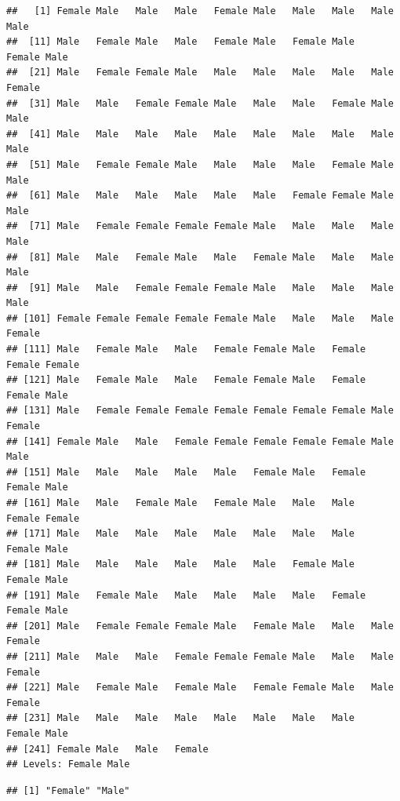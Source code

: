 \documentclass[10pt,ngerman,onside]{article}
\newenvironment{Shaded}{\begin{snugshade}}{\end{snugshade}}
\newcommand{\KeywordTok}[1]{\textcolor[rgb]{0.13,0.29,0.53}{\textbf{#1}}}
\newcommand{\CommentTok}[1]{\textcolor[rgb]{0.56,0.35,0.01}{\textit{#1}}}
\newcommand{\OperatorTok}[1]{\textcolor[rgb]{0.81,0.36,0.00}{\textbf{#1}}}
\newcommand{\NormalTok}[1]{#1}
\begin{document}
\begin{verbatim}
##   [1] Female Male   Male   Male   Female Male   Male   Male   Male   Male  
##  [11] Male   Female Male   Male   Female Male   Female Male   Female Male  
##  [21] Male   Female Female Male   Male   Male   Male   Male   Male   Female
##  [31] Male   Male   Female Female Male   Male   Male   Female Male   Male  
##  [41] Male   Male   Male   Male   Male   Male   Male   Male   Male   Male  
##  [51] Male   Female Female Male   Male   Male   Male   Female Male   Male  
##  [61] Male   Male   Male   Male   Male   Male   Female Female Male   Male  
##  [71] Male   Female Female Female Female Male   Male   Male   Male   Male  
##  [81] Male   Male   Female Male   Male   Female Male   Male   Male   Male  
##  [91] Male   Male   Female Female Female Male   Male   Male   Male   Male  
## [101] Female Female Female Female Female Male   Male   Male   Male   Female
## [111] Male   Female Male   Male   Female Female Male   Female Female Female
## [121] Male   Female Male   Male   Female Female Male   Female Female Male  
## [131] Male   Female Female Female Female Female Female Female Male   Female
## [141] Female Male   Male   Female Female Female Female Female Male   Male  
## [151] Male   Male   Male   Male   Male   Female Male   Female Female Male  
## [161] Male   Male   Female Male   Female Male   Male   Male   Female Female
## [171] Male   Male   Male   Male   Male   Male   Male   Male   Female Male  
## [181] Male   Male   Male   Male   Male   Male   Female Male   Female Male  
## [191] Male   Female Male   Male   Male   Male   Male   Female Female Male  
## [201] Male   Female Female Female Male   Female Male   Male   Male   Female
## [211] Male   Male   Male   Female Female Female Male   Male   Male   Female
## [221] Male   Female Male   Female Male   Female Female Male   Male   Female
## [231] Male   Male   Male   Male   Male   Male   Male   Male   Female Male  
## [241] Female Male   Male   Female
## Levels: Female Male
\end{verbatim}

\begin{Shaded}
\end{Shaded}

\begin{verbatim}
## [1] "Female" "Male"
\end{verbatim}
\end{document}
